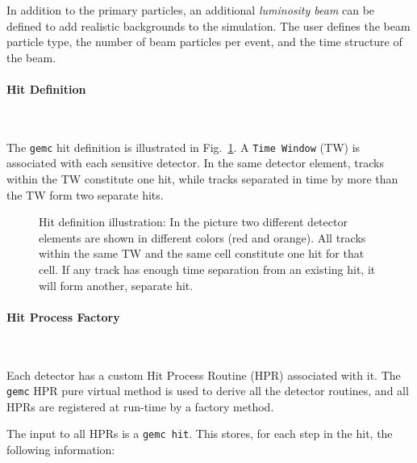 In addition to the primary particles, an additional {\it luminosity beam} 
can be defined to add realistic backgrounds to the simulation.  The user 
defines the beam particle type, the number of beam particles per event, and 
the time structure of the beam.

\paragraph{Hit Definition}

~~

\vskip 0.3cm

The {\tt gemc} hit definition is illustrated in Fig.~\ref{fig:hit_def}. A 
{\tt Time Window} (TW) is associated with each sensitive detector. In the 
same detector element, tracks within the TW constitute one hit, while 
tracks separated in time by more than the TW form two separate hits.

\begin{figure}[h]
\begin{center}
\caption{\small{Hit definition illustration: In the picture two different 
detector elements are shown in different colors (red and orange). All 
tracks within the same TW and the same cell constitute one hit for that cell.
If any track has enough time separation from an existing hit, it will form 
another, separate hit.}}
\label{fig:hit_def}
\end{center}
\end{figure}

\paragraph{Hit Process Factory}

~~

\vskip 0.3cm

Each detector has a custom Hit Process Routine (HPR) associated with it. 
The {\tt gemc} HPR pure virtual method is used to derive all the detector 
routines, and all HPRs are registered at run-time by a factory method.

The input to all HPRs is a {\tt gemc hit}. This stores, for each step in the 
hit, the following information:

